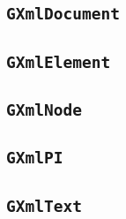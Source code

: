 \documentclass{article}[12pt,a4]
\begin{document}
\subsection{{\tt GXmlDocument}}

\subsection{{\tt GXmlElement}}

\subsection{{\tt GXmlNode}}

\subsection{{\tt GXmlPI}}

\subsection{{\tt GXmlText}}
\end{document}
